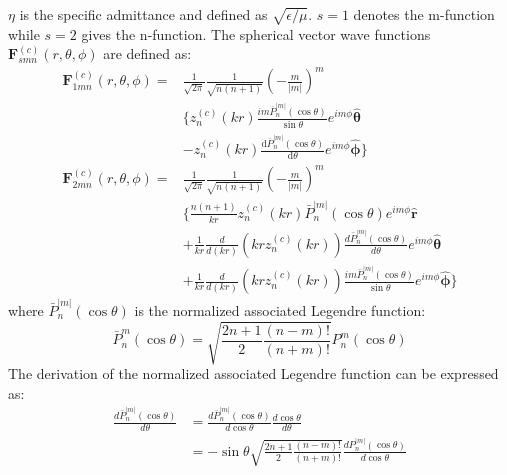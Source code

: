 \documentclass{article}
\begin{document}
\(\eta\) is the specific admittance and defined as \(\sqrt{\epsilon/\mu}\). \(s = 1\) denotes the m-function while \(s = 2\) gives the n-function. The spherical vector wave functions \(\mathbf{F}_{smn}^{(c)}(r,\theta,\phi)\) are defined as:
\begin{equation}
    \begin{split}
        \mathbf{F}_{1mn}^{(c)}(r,\theta,\phi) = &\frac{1}{\sqrt{2 \pi}} \frac{1}{\sqrt{n(n+1)}} \left( -\frac{m}{|m|} \right)^m \\
        &\Bigg\{ z_n^{(c)}(kr) \frac{i m \overline{P}_n^{|m|}(\cos \theta)}{\sin \theta} e^{i m \phi} \boldsymbol{\hat{\theta}} \\
        &- z_n^{(c)}(kr) \frac{\mathrm{d} \overline{P}_n^{|m|}(\cos \theta)}{\mathrm{d} \theta} e^{i m \phi} \boldsymbol{\hat{\phi}} \Bigg\} \\
        \mathbf{F}_{2mn}^{(c)}(r, \theta, \phi) = &\frac{1}{\sqrt{2\pi}} \frac{1}{\sqrt{n(n+1)}} \left( -\frac{m}{|m|} \right)^m \\
        &\Bigg\{ \frac{n(n+1)}{kr} z_n^{(c)}(kr) \bar{P}_n^{|m|}(\cos \theta) e^{im\phi} \boldsymbol{\hat{r}} \\
        &+ \frac{1}{kr} \frac{d}{d(kr)} \left( kr z_n^{(c)}(kr) \right) \frac{d \bar{P}_n^{|m|}(\cos \theta)}{d\theta} e^{im\phi} \boldsymbol{\hat{\theta}} \\
        &+ \frac{1}{kr} \frac{d}{d(kr)} \left( kr z_n^{(c)}(kr) \right) \frac{im \bar{P}_n^{|m|}(\cos \theta)}{\sin \theta} e^{im\phi} \boldsymbol{\hat{\phi}} \Bigg\}
    \end{split}
\end{equation}
where \(\bar{P}_n^{|m|}(\cos \theta)\) is the normalized associated Legendre function:
\begin{equation}
    \bar{P}_n^m(\cos \theta) = \sqrt{\frac{2n+1}{2} \frac{(n-m)!}{(n+m)!}} P_n^m(\cos \theta)
\end{equation}
The derivation of the normalized associated Legendre function can be expressed as:
\begin{equation}
    \begin{split}
        \frac{d \bar{P}_n^{|m|}(\cos \theta)}{d\theta} &= \frac{d \bar{P}_n^{|m|}(\cos \theta)}{d\cos \theta} \frac{d\cos \theta}{d\theta} \\
        &= -\sin\theta \sqrt{\frac{2n+1}{2} \frac{(n-m)!}{(n+m)!}} \frac{dP_n^{|m|}(\cos \theta)}{d\cos \theta}
    \end{split}
\end{equation}
\end{document}
